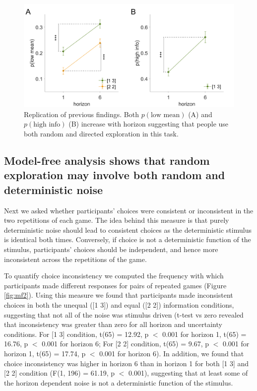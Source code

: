 \documentclass[12pt]{article}
\begin{document}
	\begin{figure}[H]
		\begin{center}
			\includegraphics[width=\textwidth]{figures/line_modelfree.png}
			\caption{
			Replication of previous findings. Both  $p(\mbox{low mean})$ (A) and $p(\mbox{high info})$ (B) increase with horizon suggesting that people use both random and directed exploration in this task.  }
			\label{fig:modelfree}
		\end{center}
	\end{figure}
	
	\subsection*{Model-free analysis shows that random exploration may involve both random and deterministic noise}
	
	Next we asked whether participants' choices were consistent or inconsistent in the two repetitions of each game.  The idea behind this measure is that purely deterministic noise should lead to consistent choices as the deterministic stimulus is identical both times. Conversely, if choice is not a deterministic function of the stimulus, participants' choices should be independent, and hence more inconsistent across the repetitions of the game. 
	
	To quantify choice inconsistency we computed the frequency with which participants made different responses for pairs of repeated games (Figure \ref{fig:mf2}). Using this measure we found that participants made inconsistent choices in both the unequal ([1 3]) and equal ([2 2]) information conditions, suggesting that not all of the noise was stimulus driven (t-test vs zero revealed that inconsistency was greater than zero for all horizon and uncertainty conditions.  For [1 3] condition, t(65) = 12.92, p $<$ 0.001 for horizon 1, t(65) = 16.76, p $<$ 0.001 for horizon 6; For [2 2] condition, t(65) = 9.67, p $<$ 0.001 for horizon 1, t(65) = 17.74, p $<$ 0.001 for horizon 6). In addition, we found that choice inconsistency was higher in horizon 6 than in horizon 1 for both [1 3] and [2 2] condition (F(1, 196) = 61.19, p $<$ 0.001), suggesting that at least some of the horizon dependent noise is not a deterministic function of the stimulus.
	
\end{document}
